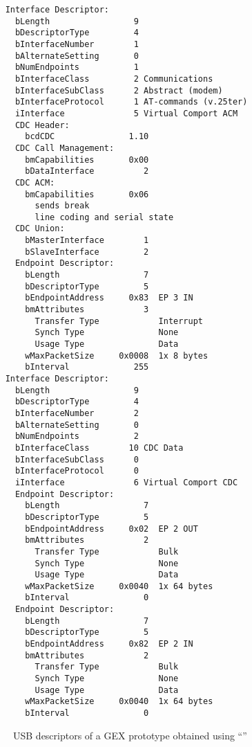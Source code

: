 \begin{minipage}[t]{0.5\textwidth}\scriptsize
\begin{verbatim}
    Interface Descriptor:
      bLength                 9
      bDescriptorType         4
      bInterfaceNumber        1
      bAlternateSetting       0
      bNumEndpoints           1
      bInterfaceClass         2 Communications
      bInterfaceSubClass      2 Abstract (modem)
      bInterfaceProtocol      1 AT-commands (v.25ter)
      iInterface              5 Virtual Comport ACM
      CDC Header:
        bcdCDC               1.10
      CDC Call Management:
        bmCapabilities       0x00
        bDataInterface          2
      CDC ACM:
        bmCapabilities       0x06
          sends break
          line coding and serial state
      CDC Union:
        bMasterInterface        1
        bSlaveInterface         2 
      Endpoint Descriptor:
        bLength                 7
        bDescriptorType         5
        bEndpointAddress     0x83  EP 3 IN
        bmAttributes            3
          Transfer Type            Interrupt
          Synch Type               None
          Usage Type               Data
        wMaxPacketSize     0x0008  1x 8 bytes
        bInterval             255
    Interface Descriptor:
      bLength                 9
      bDescriptorType         4
      bInterfaceNumber        2
      bAlternateSetting       0
      bNumEndpoints           2
      bInterfaceClass        10 CDC Data
      bInterfaceSubClass      0 
      bInterfaceProtocol      0 
      iInterface              6 Virtual Comport CDC
      Endpoint Descriptor:
        bLength                 7
        bDescriptorType         5
        bEndpointAddress     0x02  EP 2 OUT
        bmAttributes            2
          Transfer Type            Bulk
          Synch Type               None
          Usage Type               Data
        wMaxPacketSize     0x0040  1x 64 bytes
        bInterval               0
      Endpoint Descriptor:
        bLength                 7
        bDescriptorType         5
        bEndpointAddress     0x82  EP 2 IN
        bmAttributes            2
          Transfer Type            Bulk
          Synch Type               None
          Usage Type               Data
        wMaxPacketSize     0x0040  1x 64 bytes
        bInterval               0
\end{verbatim}
\end{minipage}\vspace{-1em}
\begin{figure}[H]
	\caption{\label{fig:gex_descriptors}USB descriptors of a GEX prototype obtained using ``''}
\end{figure}
